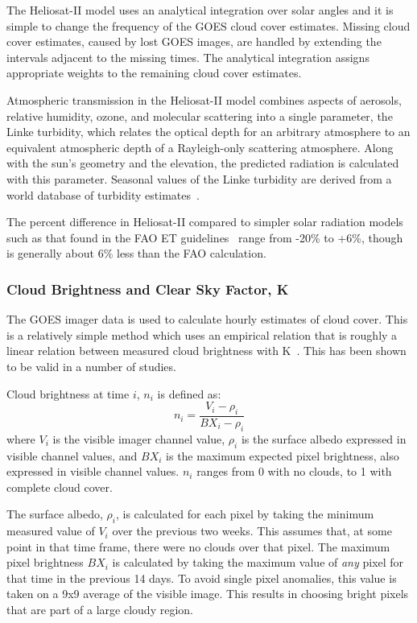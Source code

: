 \documentclass[reviewcopy]{elsart}
\begin{document}
The Heliosat-II model uses an analytical integration over solar angles
and it is simple to change the frequency of the \ac{GOES} cloud cover
estimates.  Missing cloud cover estimates, caused by lost \ac{GOES}
images, are handled by extending the intervals adjacent to the missing
times.  The analytical integration assigns appropriate weights to the
remaining cloud cover estimates.

Atmospheric transmission in the Heliosat-II model combines aspects of
aerosols, relative humidity, ozone, and molecular scattering into a
single parameter, the Linke turbidity, which relates the optical depth
for an arbitrary atmosphere to an equivalent atmospheric depth of a
Rayleigh-only scattering atmosphere.  Along with the sun's geometry
and the elevation, the predicted radiation is calculated with this
parameter.  Seasonal values of the Linke turbidity are derived from a
world database of turbidity
estimates~\citep{remund03world-linke-turbid-infor}.

The percent difference in Heliosat-II compared to simpler solar
radiation models such as that found in the FAO \ac{ET}
guidelines~\citep{allen.ea:98:crop} range from -20\% to +6\%, though
is generally about 6\% less than the FAO calculation.

\subsubsection{Cloud Brightness and Clear Sky Factor, \ac{K}}
\label{sec:cloud-brightn-clear}

The \ac{GOES} imager data is used to calculate hourly estimates of
cloud cover.  This is a relatively simple method which uses an
empirical relation that is roughly a linear relation between measured
cloud brightness with \ac{K}~\citep{beyer.ea:96:modif-of}.  This has
been shown to be valid in a number of studies.

Cloud brightness at time $i$, $n_i$ is defined as: \[n_i = \frac{V_i -
  \rho_i}{BX_i - \rho_i}\] where $V_i$ is the visible imager channel
value, $\rho_i$ is the surface albedo expressed in visible channel
values, and $BX_i$ is the maximum expected pixel brightness, also
expressed in visible channel values.  $n_i$ ranges from 0 with no
clouds, to 1 with complete cloud cover.

The surface albedo, $\rho_i$, is calculated for each pixel by taking
the minimum measured value of $V_i$ over the previous two weeks.  This
assumes that, at some point in that time frame, there were no clouds
over that pixel.  The maximum pixel brightness $BX_i$ is calculated by
taking the maximum value of \emph{any} pixel for that time in the
previous 14 days.  To avoid single pixel anomalies, this value is
taken on a 9x9 average of the visible image.  This results in choosing
bright pixels that are part of a large cloudy region.
\end{document}
